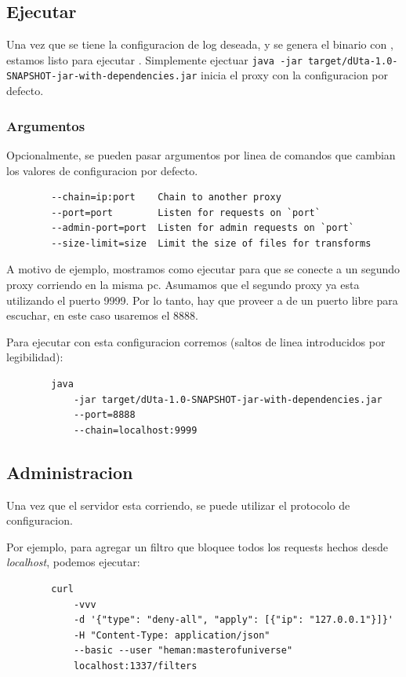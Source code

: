 \documentclass[11pt,a4paper,titlepage]{article}
\begin{document}
    \subsection{Ejecutar \duta}
    Una vez que se tiene la configuracion de log deseada, y se genera el binario con , estamos listo para ejecutar \duta.
    Simplemente ejectuar \texttt{java -jar target/dUta-1.0-SNAPSHOT-jar-with-dependencies.jar} inicia el proxy con la configuracion por defecto.

    \subsubsection{Argumentos}
    Opcionalmente, se pueden pasar argumentos por linea de comandos que cambian los valores de configuracion por defecto.
    \begin{verbatim}
        --chain=ip:port    Chain to another proxy
        --port=port        Listen for requests on `port`
        --admin-port=port  Listen for admin requests on `port`
        --size-limit=size  Limit the size of files for transforms
    \end{verbatim}

    A motivo de ejemplo, mostramos como ejecutar \duta para que se conecte a un segundo proxy corriendo en la misma pc.
    Asumamos que el segundo proxy ya esta utilizando el puerto 9999.
    Por lo tanto, hay que proveer a \duta de un puerto libre para escuchar, en este caso usaremos el 8888.

    Para ejecutar con esta configuracion corremos (saltos de linea introducidos por legibilidad):
    \begin{verbatim}
        java
            -jar target/dUta-1.0-SNAPSHOT-jar-with-dependencies.jar
            --port=8888
            --chain=localhost:9999
    \end{verbatim}

    \subsection{Administracion}
    Una vez que el servidor esta corriendo, se puede utilizar el protocolo de configuracion.

    Por ejemplo, para agregar un filtro que bloquee todos los requests hechos desde \textit{localhost}, podemos ejecutar:
    \begin{verbatim}
        curl
            -vvv
            -d '{"type": "deny-all", "apply": [{"ip": "127.0.0.1"}]}'
            -H "Content-Type: application/json"
            --basic --user "heman:masterofuniverse"
            localhost:1337/filters
    \end{verbatim}


\end{document}
